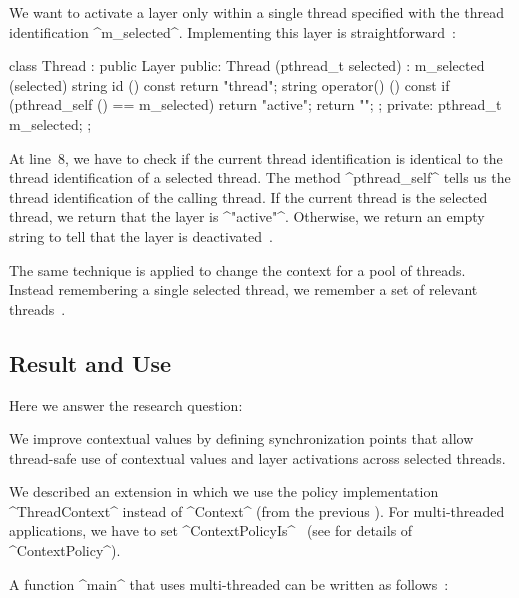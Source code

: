 \begin{example}
We want to activate a layer only within a single thread specified with the thread identification ^m_selected^.
Implementing this layer is straightforward~\cite{raab2015global}:

\begin{code}[language=Cpp]
class Thread : public Layer
{
public:
	Thread (pthread_t selected) :
		m_selected (selected) {}
	string id () const { return "thread"; }
	string operator() () const {
		if (pthread_self () == m_selected) return "active";
		return "";
	};
private:
	pthread_t m_selected;
};
\end{code}

At line~8, we have to check if the current thread identification is identical to the thread identification of a selected thread.
The method ^pthread_self^ tells us the thread identification of the calling thread.
If the current thread is the selected thread, we return that the layer is ^"active"^.
Otherwise, we return an empty string to tell that the layer is deactivated~\cite{raab2015global}.
\end{example}


The same technique is applied to change the context for a pool of threads.
Instead remembering a single selected thread, we remember a set of relevant threads~\cite{raab2015global}.





\subsection{Result and Use}

Here we answer the research question:
\rqFrontendConcurrent*

\begin{finding}
We improve contextual values by defining synchronization points that allow thread-safe use of contextual values and layer activations across selected threads.
\end{finding}

We described an extension in which we use the policy implementation ^ThreadContext^ instead of ^Context^ (from the previous ).
For multi-threaded applications, we have to set ^ContextPolicyIs^~\cite{raab2015global} (see  for details of ^ContextPolicy^).

A function ^main^ that uses multi-threaded \elektra{} can be written as follows~\cite{raab2015global}:

